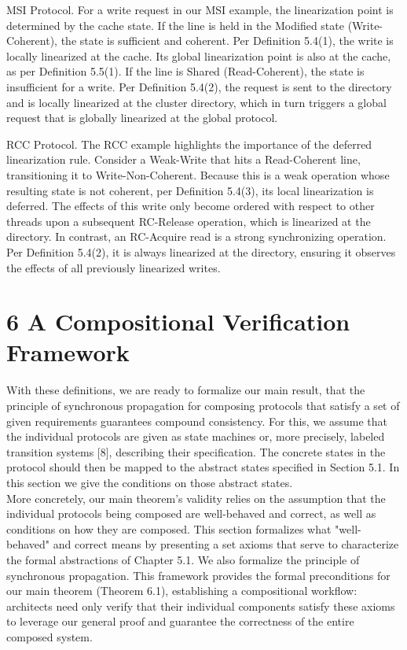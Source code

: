 \documentclass[10pt]{article}
\begin{document}
MSI Protocol. For a write request in our MSI example, the linearization point is determined by the cache state. If the line is held in the Modified state (Write-Coherent), the state is sufficient and coherent. Per Definition 5.4(1), the write is locally linearized at the cache. Its global linearization point is also at the cache, as per Definition 5.5(1). If the line is Shared (Read-Coherent), the state is insufficient for a write. Per Definition 5.4(2), the request is sent to the directory and is locally linearized at the cluster directory, which in turn triggers a global request that is globally linearized at the global protocol.

RCC Protocol. The RCC example highlights the importance of the deferred linearization rule. Consider a Weak-Write that hits a Read-Coherent line, transitioning it to Write-Non-Coherent. Because this is a weak operation whose resulting state is not coherent, per Definition 5.4(3), its local linearization is deferred. The effects of this write only become ordered with respect to other threads upon a subsequent RC-Release operation, which is linearized at the directory. In contrast, an RC-Acquire read is a strong synchronizing operation. Per Definition 5.4(2), it is always linearized at the directory, ensuring it observes the effects of all previously linearized writes.

\section*{6 A Compositional Verification Framework}
With these definitions, we are ready to formalize our main result, that the principle of synchronous propagation for composing protocols that satisfy a set of given requirements guarantees compound consistency. For this, we assume that the individual protocols are given as state machines or, more precisely, labeled transition systems [8], describing their specification. The concrete states in the protocol should then be mapped to the abstract states specified in Section 5.1. In this section we give the conditions on those abstract states.\\
More concretely, our main theorem's validity relies on the assumption that the individual protocols being composed are well-behaved and correct, as well as conditions on how they are composed. This section formalizes what "well-behaved" and correct means by presenting a set axioms that serve to characterize the formal abstractions of Chapter 5.1. We also formalize the principle of synchronous propagation. This framework provides the formal preconditions for our main theorem (Theorem 6.1), establishing a compositional workflow: architects need only verify that their individual components satisfy these axioms to leverage our general proof and guarantee the correctness of the entire composed system.
\end{document}
